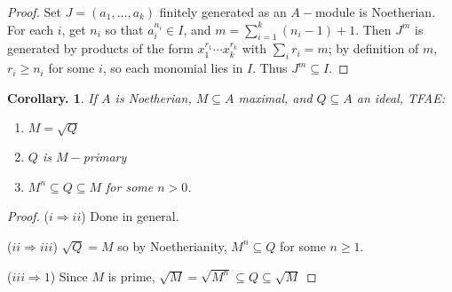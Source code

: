 \documentclass[11pt, a4paper]{memoir}
\newcommand{\imp}[2]{($#1\Rightarrow#2$)\hspace{0.2cm}}
\theoremstyle{change}
\newtheorem{corollary}[theorem]{Corollary.}
\theoremstyle{plain}
\theoremstyle{nonumberplain}
\newtheorem{proof}{Proof}
\numberwithin{equation}{section}
\begin{document}
\begin{proof}
    Set $J=(a_1,\ldots,a_k)$ finitely generated as an $A-$module is Noetherian.
    For each $i$, get $n_i$ so that $a_i^{n_i}\in I$, and $m=\sum_{i=1}^k(n_i-1)+1$.
    Then $J^m$ is generated by products of the form $x_1^{r_1}\cdots x_k^{r_k}$ with $\sum_i r_i=m$; by definition of $m$, $r_i\geq n_i$ for some $i$, so each monomial lies in $I$.
    Thus $J^m\subseteq I$.
\end{proof}
\begin{corollary}
    If $A$ is Noetherian, $M\subseteq A$ maximal, and $Q\subseteq A$ an ideal, TFAE:
    \begin{enumerate}[nl,r]
        \item $M=\sqrt{Q}$
        \item $Q$ is $M-$primary
        \item $M^n\subseteq Q\subseteq M$ for some $n>0$.
    \end{enumerate}
\end{corollary}
\begin{proof}
    \imp{i}{ii}
    Done in general.

    \imp{ii}{iii}
    $\sqrt{Q}= M$ so by Noetherianity, $M^n\subseteq Q$ for some $n\geq 1$.

    \imp{iii}{1}
    Since $M$ is prime, $\sqrt{M}=\sqrt{M^n}\subseteq Q\subseteq\sqrt{M}$
\end{proof}
\end{document}
